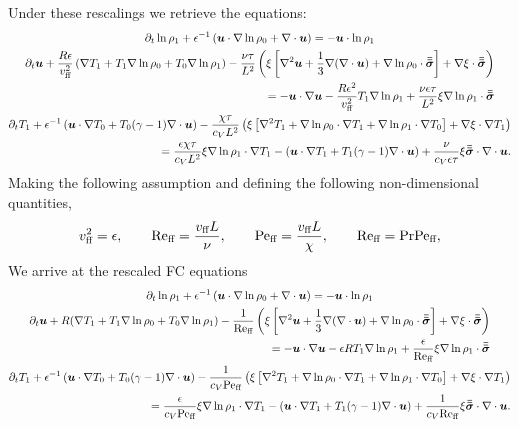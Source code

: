Under these rescalings we retrieve the equations:
\begin{gather}
\partial_t \ln\rho_1 + \epsilon^{-1}\left(\bm{u}\cdot\nabla\ln\rho_0 + \nabla\cdot\bm{u}\right)
= -\bm{u}\cdot\ln\rho_1
\\
\begin{split}
\partial_t \bm{u} + \frac{R\epsilon}{v_{\text{ff}}^2}\left(\nabla T_1 + T_1\nabla\ln\rho_0 + T_0\nabla\ln\rho_1\right)
- \frac{\nu\tau}{L^2}\left( \xi\left[\nabla^2\bm{u} + \frac{1}{3}\nabla(\nabla\cdot\bm{u}) + \nabla\ln\rho_0\cdot\bm{\bar{\bar{\sigma}}}\right] + \nabla\xi\cdot\bm{\bar{\bar{\sigma}}}\right)
\\ = - \bm{u}\cdot\nabla\bm{u} - \frac{R\epsilon^2}{v_{\text{ff}}^2}T_1\nabla\ln\rho_1
+ \frac{\nu\epsilon\tau}{L^2}\xi\nabla\ln\rho_1\cdot\bm{\bar{\bar{\sigma}}}
\end{split}
\\
\begin{split}
\partial_t T_1 + \epsilon^{-1}\left(\bm{u}\cdot\nabla T_0 + T_0(\gamma-1)\nabla\cdot\bm{u}\right)
-\frac{\chi \tau}{c_V L^2}\left(\xi\left[\nabla^2 T_1 + \nabla\ln\rho_0\cdot\nabla T_1 + \nabla\ln\rho_1 \cdot\nabla T_0 \right] + \nabla\xi\cdot\nabla T_1\right)
\\= \frac{\epsilon\chi\tau}{c_V L^2}\xi\nabla\ln\rho_1 \cdot\nabla T_1 - 
\left(\bm{u}\cdot\nabla T_1 + T_1(\gamma-1)\nabla\cdot\bm{u}\right) + \frac{\nu}{c_V \epsilon \tau }\xi\bm{\bar{\bar{\sigma}}}\cdot\nabla\cdot\bm{u}.
\end{split}
\end{gather}
Making the following assumption and defining the following non-dimensional quantities,
\begin{equation}
v_{\text{ff}}^2 = \epsilon, \qquad \text{Re}_{\text{ff}} = \frac{v_{\text{ff}} L}{\nu}, \qquad
\text{Pe}_{\text{ff}} = \frac{v_{\text{ff}} L}{\chi}, \qquad \text{Re}_{\text{ff}} = \text{Pr} \text{Pe}_{\text{ff}},
\end{equation}
We arrive at the rescaled FC equations
\begin{gather}
\partial_t \ln\rho_1 + \epsilon^{-1}\left(\bm{u}\cdot\nabla\ln\rho_0 + \nabla\cdot\bm{u}\right)
= -\bm{u}\cdot\ln\rho_1
\\
\begin{split}
\partial_t \bm{u} + R(\nabla T_1 + T_1\nabla\ln\rho_0 + T_0\nabla\ln\rho_1)
- \frac{1}{\text{Re}_{\text{ff}}}\left( \xi\left[\nabla^2\bm{u} + \frac{1}{3}\nabla(\nabla\cdot\bm{u}) + \nabla\ln\rho_0\cdot\bm{\bar{\bar{\sigma}}}\right] + \nabla\xi\cdot\bm{\bar{\bar{\sigma}}}\right)
\\ = - \bm{u}\cdot\nabla\bm{u} - \epsilon R T_1\nabla\ln\rho_1
+ \frac{\epsilon}{\text{Re}_{\text{ff}}}\xi\nabla\ln\rho_1\cdot\bm{\bar{\bar{\sigma}}}
\end{split}
\\
\begin{split}
\partial_t T_1 + \epsilon^{-1}\left(\bm{u}\cdot\nabla T_0 + T_0(\gamma-1)\nabla\cdot\bm{u}\right)
-\frac{1}{c_V \text{Pe}_{\text{ff}}}\left(\xi\left[\nabla^2 T_1 + \nabla\ln\rho_0\cdot\nabla T_1 + \nabla\ln\rho_1 \cdot\nabla T_0 \right] + \nabla\xi\cdot\nabla T_1\right)
\\= \frac{\epsilon}{c_V  \text{Pe}_{\text{ff}}} \xi\nabla\ln\rho_1 \cdot\nabla T_1 - 
\left(\bm{u}\cdot\nabla T_1 + T_1(\gamma-1)\nabla\cdot\bm{u}\right) + \frac{1}{c_V \text{Re}_{\text{ff}}}\xi\bm{\bar{\bar{\sigma}}}\cdot\nabla\cdot\bm{u}.
\end{split}
\end{gather}

